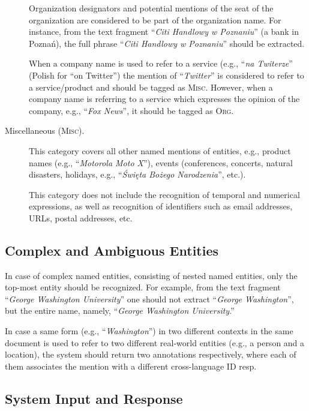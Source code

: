 \documentclass[11pt]{article}
\begin{document}
\begin{description}
Organization designators and potential mentions of the seat of the organization
are considered to be part of the organization name. For instance, from the text
fragment ``\textit{Citi Handlowy w Poznaniu}'' (a bank in Poznań), the full
phrase ``\textit{Citi Handlowy w Poznaniu}'' should be extracted.
			
When a company name is used to refer to a service (e.g., ``\textit{na
Twiterze}'' (Polish for ``on Twitter'') the mention of ``\textit{Twitter}'' is
considered to refer to a service/product and should be tagged as \textsc{Misc}.
However, when a company name is referring to a service which expresses the
opinion of the company, e.g., ``\textit{Fox News}'', it should be tagged as
\textsc{Org}.			

\item[Miscellaneous (\textsc{Misc}).]

This category covers all other named mentions of entities, e.g., product names
(e.g., ``\textit{Motorola Moto X}''), events (conferences, concerts, natural
disasters, holidays, e.g., ``\textit{Święta Bożego Narodzenia}'', etc.).

This category does not include the recognition of temporal and numerical
expressions, as well as recognition of identifiers such as email addresses,
URLs, postal addresses, etc.

\end{description}

\subsection{Complex and Ambiguous Entities}

In case of complex named entities, consisting of nested named entities, only
the top-most entity should be recognized. For example, from the text fragment
``\textit{George Washington University}'' one should not extract
``\textit{George Washington}'', but the entire name, namely, ``\textit{George
Washington University}.''

In case a same form (e.g., ``\textit{Washington}'') in two different contexts
in the same document is used to refer to two different real-world entities
(e.g., a person and a location), the system should return two annotations
respectively, where each of them associates the mention with a different
cross-language ID resp.


\subsection{System Input and Response}
\label{sec:protocol}
\end{document}
